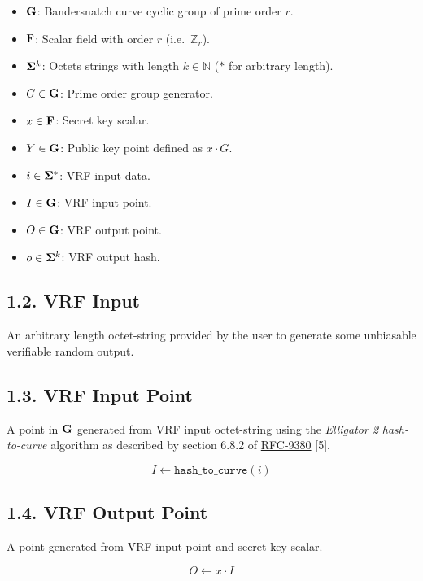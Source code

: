 \documentclass[
]{article}
\begin{document}
\begin{itemize}
\item
  \(\bold{G}\): Bandersnatch curve cyclic group of prime order \(r\).
\item
  \(\bold{F}\): Scalar field with order \(r\) (i.e.~\(\mathbb{Z}_r\)).
\item
  \(\bold{\Sigma}^k\): Octets strings with length \(k \in \mathbb{N}\)
  (\(*\) for arbitrary length).
\item
  \(G \in \bold{G}\): Prime order group generator.
\item
  \(x \in \bold{F}\): Secret key scalar.
\item
  \(Y \in \bold{G}\): Public key point defined as \(x \cdot G\).
\item
  \(i \in \bold{\Sigma}^*\): VRF input data.
\item
  \(I \in \bold{G}\): VRF input point.
\item
  \(O \in \bold{G}\): VRF output point.
\item
  \(o \in \bold{\Sigma}^k\): VRF output hash.
\end{itemize}

\subsection{1.2. VRF Input}\label{vrf-input}

An arbitrary length octet-string provided by the user to generate some
unbiasable verifiable random output.

\subsection{1.3. VRF Input Point}\label{vrf-input-point}

A point in \(\bold{G}\) generated from VRF input octet-string using the
\emph{Elligator 2} \emph{hash-to-curve} algorithm as described by
section 6.8.2 of
\href{https://datatracker.ietf.org/doc/rfc9380}{RFC-9380} {[}5{]}.

\[I \gets \texttt{hash\_to\_curve}(i)\]

\subsection{1.4. VRF Output Point}\label{vrf-output-point}

A point generated from VRF input point and secret key scalar.

\[O \gets x \cdot I\]
\end{document}
